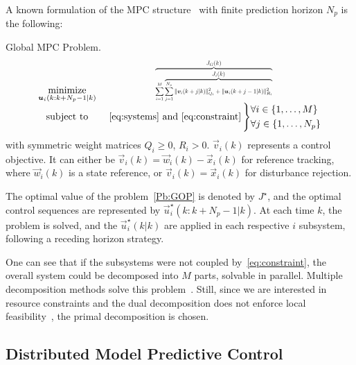 \documentclass[a4paper, 10 pt, conference]{ieeeconf}  %
\begin{document}
A known formulation of the MPC structure~\cite{CamachoBordons2007,VelardeEtAl2017,VelardeEtAl2017a,SimonEtAl2012,ChanfreutEtAl2018} with finite prediction horizon $N_{p}$ is the following:
\begin{problem}{Global MPC Problem.}\label{Pb:GOP}
\begin{equation*}
\begin{matrix}
\underset{\vec{u}_i(k:k+N_{p}-1|k)}{\mathrm{minimize}}&\resizebox{0.35\textwidth}{!}{$\overbrace{\sum\limits^{M}_{i=1} \overbrace{\sum_{j=1}^{N_{p}}\|\vec{v}_i(k+j|k)\|^{2}_{Q_i}+\|\vec{u}_i(k+j-1|k)\|^{2}_{R_i}}^{\textstyle J_{i}(k)}}^{\textstyle J_{G}(k)}$}\\
\mathrm{subject~ to}&~\eqref{eq:systems}\mathrm{~and~}\eqref{eq:constraint}
\left\}\small
\begin{aligned}
  &\forall i\in\{1,\dots,M\}\\
  &\forall j\in\{1,\dots,N_{p}\}
\end{aligned}\right.

\end{matrix}
\end{equation*}
with symmetric weight matrices ${Q_{i}\geq0}$, ${R_{i}>0}$. $\vec{v}_{i}(k)$ represents a control objective. It can either be ${\vec{v}_{i}(k)=\vec{w}_{i}(k)-\vec{x}_{i}(k)}$ for reference tracking, where $\vec{w}_{i}(k)$ is a state reference, or ${\vec{v}_{i}(k)=\vec{x}_{i}(k)}$ for disturbance rejection.

The optimal value of the problem~\ref{Pb:GOP}
is denoted by $J^{\star}$, and the optimal control sequences are represented by ${\vec{u}_i^{\star}(k:k+N_{p}-1|k)}$.
At each time $k$, the problem is solved, and the $\vec{u}_i^{\star}(k|k)$ are applied in each respective $i$ subsystem, following a receding horizon strategy.
\end{problem}

One can see that if the subsystems were not coupled by~\eqref{eq:constraint},  the overall system could be decomposed into $M$ parts, solvable in parallel.
Multiple decomposition methods solve this problem~\cite{BoydEtAl2011,PaulenEtAl2016,PflaumEtAl2014,ChanfreutEtAl2018}.
Still, since we are interested in resource constraints and the dual decomposition does not enforce local feasibility~\cite{BoydEtAl2015}, the primal decomposition is chosen.

\subsection{Distributed Model Predictive Control}\label{ssec:dMPC}
\end{document}
